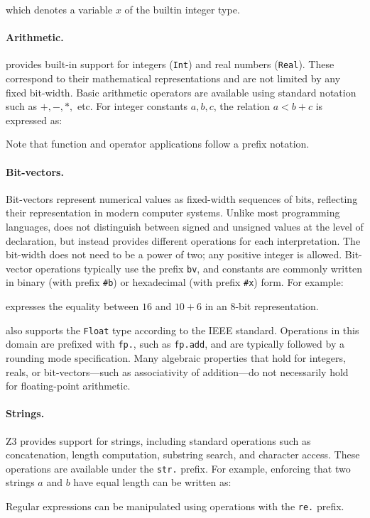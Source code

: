 \begin{center}
\end{center}
which denotes a variable $x$ of the builtin integer type.

\paragraph{Arithmetic.}
\ziii provides built-in support for integers (\texttt{Int}) and real numbers (\texttt{Real}).
These correspond to their mathematical representations and are not limited by any fixed bit-width.
Basic arithmetic operators are available using standard notation such as $+, -, *,$ etc.
For integer constants $a, b, c$, the relation $a < b + c$ is expressed as:
\begin{center}
\end{center}
Note that function and operator applications follow a prefix notation.

\paragraph{Bit-vectors.}
Bit-vectors represent numerical values as fixed-width sequences of bits, reflecting their representation in modern computer systems.
Unlike most programming languages, \ziii does not distinguish between signed and unsigned values at the level of declaration, but instead provides different operations for each interpretation.
The bit-width does not need to be a power of two; any positive integer is allowed.
Bit-vector operations typically use the prefix \texttt{bv}, and constants are commonly written in binary (with prefix \texttt{\#b}) or hexadecimal (with prefix \texttt{\#x}) form.
For example:
\begin{center}
\end{center}
expresses the equality between $16$ and $10 + 6$ in an 8-bit representation.

\ziii also supports the \texttt{Float} type according to the IEEE standard.
Operations in this domain are prefixed with \texttt{fp.}, such as \texttt{fp.add}, and are typically followed by a rounding mode specification.
Many algebraic properties that hold for integers, reals, or bit-vectors—such as associativity of addition—do not necessarily hold for floating-point arithmetic.


\paragraph{Strings.}
Z3 provides support for strings, including standard operations such as concatenation, length computation, substring search, and character access.
These operations are available under the \texttt{str.} prefix.
For example, enforcing that two strings $a$ and $b$ have equal length can be written as:
\begin{center}
\end{center}
Regular expressions can be manipulated using operations with the \texttt{re.} prefix.

